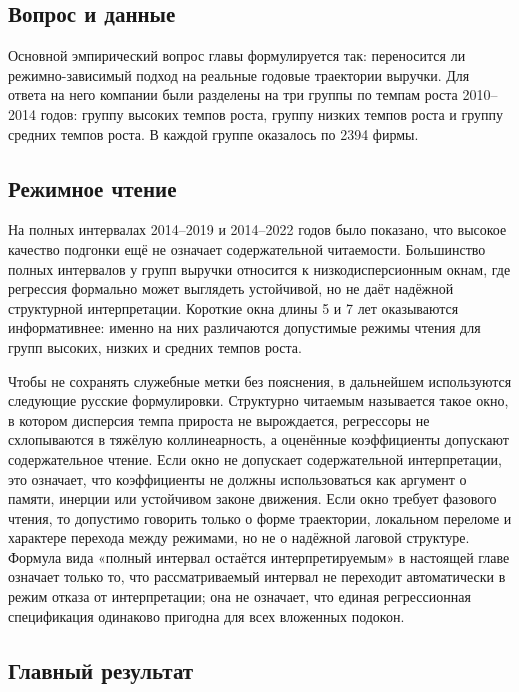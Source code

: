 \subsection{Вопрос и данные}
\label{sec:vopros-i-dannye}

Основной эмпирический вопрос главы формулируется так: переносится ли режимно-зависимый подход на реальные годовые траектории выручки. Для ответа на него компании были разделены на три группы по темпам роста 2010--2014 годов: группу высоких темпов роста, группу низких темпов роста и группу средних темпов роста. В каждой группе оказалось по 2394 фирмы.

\subsection{Режимное чтение}
\label{sec:rezhimnoe-chtenie}

На полных интервалах 2014--2019 и 2014--2022 годов было показано, что высокое качество подгонки ещё не означает содержательной читаемости. Большинство полных интервалов у групп выручки относится к низкодисперсионным окнам, где регрессия формально может выглядеть устойчивой, но не даёт надёжной структурной интерпретации. Короткие окна длины 5 и 7 лет оказываются информативнее: именно на них различаются допустимые режимы чтения для групп высоких, низких и средних темпов роста.

Чтобы не сохранять служебные метки без пояснения, в дальнейшем используются следующие русские формулировки. Структурно читаемым называется такое окно, в котором дисперсия темпа прироста не вырождается, регрессоры не схлопываются в тяжёлую коллинеарность, а оценённые коэффициенты допускают содержательное чтение. Если окно не допускает содержательной интерпретации, это означает, что коэффициенты не должны использоваться как аргумент о памяти, инерции или устойчивом законе движения. Если окно требует фазового чтения, то допустимо говорить только о форме траектории, локальном переломе и характере перехода между режимами, но не о надёжной лаговой структуре. Формула вида «полный интервал остаётся интерпретируемым» в настоящей главе означает только то, что рассматриваемый интервал не переходит автоматически в режим отказа от интерпретации; она не означает, что единая регрессионная спецификация одинаково пригодна для всех вложенных подокон.

\subsection{Главный результат}
\label{sec:glavnyi-rezultat}

